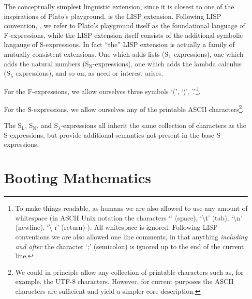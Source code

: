 The conceptually simplest linguistic extension, since it is closest to one of
the inspirations of Plato's playground, is the LISP extension. Following LISP
convention, \cite{mcCarthy1960lisp}, we refer to Plato's playground itself as
the foundational language of F-expressions, while the LISP extension itself
consists of the additional symbolic langauge of S-expressions. In fact ``the''
LISP extension is actually a family of mutually consistent extensions. One which
adds lists (S$_{\text{L}}$-expressions), one which adds the natural numbers
(S$_{\text{N}}$-expressions), one which adds the lambda calculus
(S$_{\lambda}$-expressions), and so on, as need or interest arises.

For the F-expressions, we allow ourselves three symbols `(', `)',
'.'\footnote{To make things readable, as humans we are also allowed to use any
amount of whitespace (in ASCII Unix notation the characters `\textvisiblespace'
(space), `\textbackslash t' (tab), `\textbackslash n' (newline), `\textbackslash
r' (return) ). All whitespace is ignored. Following LISP conventions we are also
allowed one line comments, in that anything \emph{including and after} the
character `;' (semicolon) is ignored up to the end of the current line.}.

For the S-expressions, we allow ourselves any of the printable ASCII
characters\footnote{We could in principle allow any collection of printable
characters such as, for example, the UTF-8 characters. However, for current
purposes the ASCII characters are sufficient and yield a simpler core
description.}.

The S$_{\text{L}}$, S$_{\text{N}}$, and S$_{\lambda}$-expressions all inherit
the same collection of characters as the S-expressions, but provide additional
semantics not present in the base S-expressions.

\section{Booting Mathematics}

